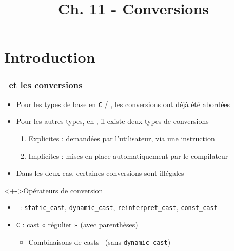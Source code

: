 


\title{Ch. 11 - Conversions}




\section{Introduction}

\begin{frame}
\frametitle{\cpp\ et les conversions}
\begin{itemize}[<+->]
\item Pour les types de base en \texttt{C} / \cpp, les conversions ont déjà été abordées
\item Pour les autres types, en \cpp, il existe deux types de conversions
	\begin{enumerate}
	\item Explicites : demandées par l'utilisateur, via une instruction
	\item Implicites : mises en place automatiquement par le compilateur
	\end{enumerate}
\item Dans les deux cas, certaines conversions sont illégales
\end{itemize}
\begin{exampleblock}<+->{Opérateurs de conversion}
	\begin{itemize}[<+->]	
	\item \cpp\ : \lstinline|static_cast|, \lstinline|dynamic_cast|, \lstinline|reinterpret_cast|, \lstinline|const_cast|
	\item \texttt{C} : cast « régulier » (avec parenthèses)
		\begin{itemize}
		\item Combinaisons de casts \cpp\ (sans \lstinline|dynamic_cast|)
		\end{itemize}
	\end{itemize}
\end{exampleblock}
\end{frame}

